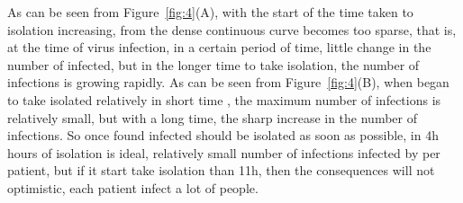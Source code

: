 As can be seen from Figure~\ref{fig:4}(A), with the start of
the time taken to isolation increasing, from the dense
continuous curve becomes too sparse, that is, at the time of
virus infection, in a certain period of time, little change in
the number of infected, but in the longer time to take
isolation, the number of infections is growing rapidly.
As can be seen from Figure~\ref{fig:4}(B), when began to take
isolated relatively in short time , the maximum number of
infections is relatively small, but with a long time, the sharp
increase in the number of infections. So once found infected
should be isolated as soon as possible, in 4h hours of isolation
is ideal, relatively small number of infections infected by per
patient, but if it start take isolation than 11h, then the
consequences will not optimistic, each patient infect
a lot of people.


